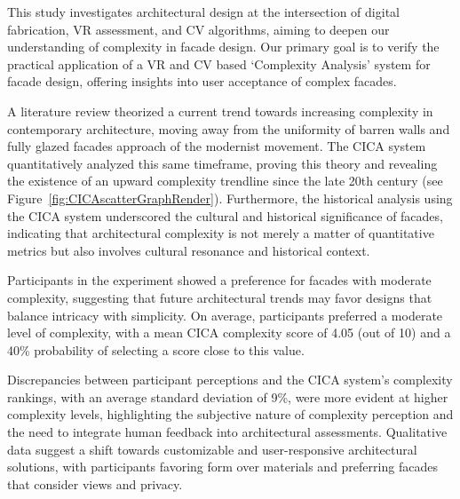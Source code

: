 


This study investigates architectural design at the intersection of digital fabrication, VR assessment, and CV algorithms, aiming to deepen our understanding of complexity in facade design.
Our primary goal is to verify the practical application of a VR and CV based `Complexity Analysis' system for facade design, offering insights into user acceptance of complex facades.

A literature review theorized a current trend towards increasing complexity in contemporary architecture, moving away from the uniformity of barren walls and fully glazed facades approach of the modernist movement.
The CICA system quantitatively analyzed this same timeframe, proving this theory and revealing the existence of an upward complexity trendline since the late 20th century (see Figure~\ref{fig:CICAscatterGraphRender}).
Furthermore, the historical analysis using the CICA system underscored the cultural and historical significance of facades, indicating that architectural complexity is not merely a matter of quantitative metrics but also involves cultural resonance and historical context.

Participants in the experiment showed a preference for facades with moderate complexity, suggesting that future architectural trends may favor designs that balance intricacy with simplicity.
On average, participants preferred a moderate level of complexity, with a mean CICA complexity score of 4.05 (out of 10) and a 40\% probability of selecting a score close to this value.

Discrepancies between participant perceptions and the CICA system's complexity rankings, with an average standard deviation of 9\%,  were more evident at higher complexity levels, highlighting the subjective nature of complexity perception and the need to integrate human feedback into architectural assessments.
Qualitative data suggest a shift towards customizable and user-responsive architectural solutions, with participants favoring form over materials and preferring facades that consider views and privacy.

